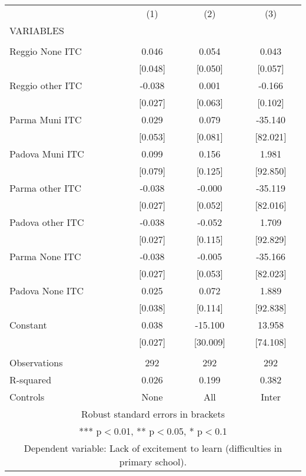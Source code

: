 \begin{tabular}{lccc} \hline
 & (1) & (2) & (3) \\
VARIABLES &  &  &  \\ \hline
 &  &  &  \\
Reggio None ITC & 0.046 & 0.054 & 0.043 \\
 & [0.048] & [0.050] & [0.057] \\
Reggio other ITC & -0.038 & 0.001 & -0.166 \\
 & [0.027] & [0.063] & [0.102] \\
Parma Muni ITC & 0.029 & 0.079 & -35.140 \\
 & [0.053] & [0.081] & [82.021] \\
Padova Muni ITC & 0.099 & 0.156 & 1.981 \\
 & [0.079] & [0.125] & [92.850] \\
Parma other ITC & -0.038 & -0.000 & -35.119 \\
 & [0.027] & [0.052] & [82.016] \\
Padova other ITC & -0.038 & -0.052 & 1.709 \\
 & [0.027] & [0.115] & [92.829] \\
Parma None ITC & -0.038 & -0.005 & -35.166 \\
 & [0.027] & [0.053] & [82.023] \\
Padova None ITC & 0.025 & 0.072 & 1.889 \\
 & [0.038] & [0.114] & [92.838] \\
Constant & 0.038 & -15.100 & 13.958 \\
 & [0.027] & [30.009] & [74.108] \\
 &  &  &  \\
Observations & 292 & 292 & 292 \\
R-squared & 0.026 & 0.199 & 0.382 \\
 Controls & None & All & Inter \\ \hline
\multicolumn{4}{c}{ Robust standard errors in brackets} \\
\multicolumn{4}{c}{ *** p$<$0.01, ** p$<$0.05, * p$<$0.1} \\
\multicolumn{4}{c}{ Dependent variable: Lack of excitement to learn (difficulties in primary school).} \\
\end{tabular}
